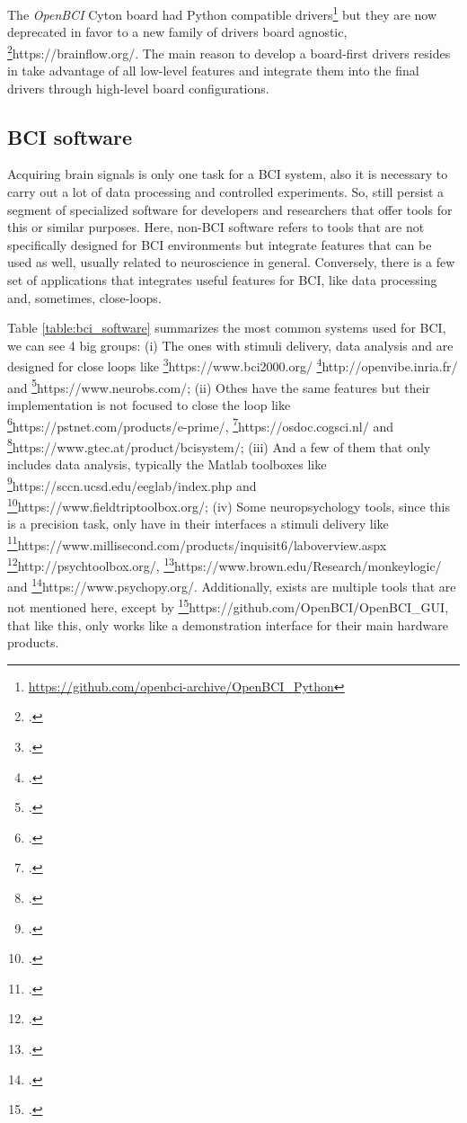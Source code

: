 The \textit{OpenBCI} Cyton board had Python compatible drivers\footnote{\href{https://github.com/openbci-archive/OpenBCI_Python}{https://github.com/openbci-archive/OpenBCI\_Python}} but they are now deprecated in favor to a new family of drivers board agnostic, \footcite{BrainFlow}{https://brainflow.org/}. The main reason to develop a board-first drivers resides in take advantage of all low-level features and integrate them into the final drivers through high-level board configurations. 



\subsection{BCI software}

Acquiring brain signals is only one task for a \gls*{BCI} system, also it is necessary to carry out a lot of data processing and controlled experiments. So, still persist a segment of specialized software for developers and researchers that offer tools for this or similar purposes. Here, non-\gls*{BCI} software refers to tools that are not specifically designed for \gls*{BCI} environments but integrate features that can be used as well, usually related to neuroscience in general. Conversely, there is a few set of applications that integrates useful features for \gls*{BCI}, like data processing and, sometimes, close-loops.

Table \ref{table:bci_software} summarizes the most common systems used for \gls*{BCI}, we can see 4 big groups: 
(i) The ones with stimuli delivery, data analysis and are designed for close loops like \footcite{BCI2000}{https://www.bci2000.org/} \footcite{OpenViBE}{http://openvibe.inria.fr/} and \footcite{Neurobehavioral Systems Presentation}{https://www.neurobs.com/};
(ii) Othes have the same features but their implementation is not focused to close the loop like \footcite{ePrime}{https://pstnet.com/products/e-prime/}, \footcite{OpenSesame}{https://osdoc.cogsci.nl/} and \footcite{g.BCISYS}{https://www.gtec.at/product/bcisystem/};
(iii) And a few of them that only includes data analysis, typically the Matlab toolboxes like \footcite{EEGLAB}{https://sccn.ucsd.edu/eeglab/index.php} and \footcite{FieldTrip}{https://www.fieldtriptoolbox.org/};
(iv) Some neuropsychology tools, since this is a precision task, only have in their interfaces a stimuli delivery like \footcite{Millisecond Inquisit Lab}{https://www.millisecond.com/products/inquisit6/laboverview.aspx} \footcite{Pychotoolbox-3}{http://psychtoolbox.org/}, \footcite{MonkeyLogic}{https://www.brown.edu/Research/monkeylogic/} and \footcite{PychoPy}{https://www.psychopy.org/}. Additionally, exists are multiple tools that are not mentioned here, except by \footcite{OpenBCI GUI}{https://github.com/OpenBCI/OpenBCI_GUI}, that like this, only works like a demonstration interface for their main hardware products.

